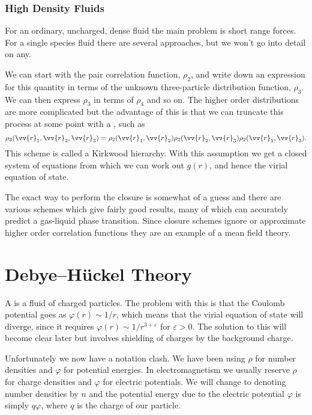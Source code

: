 \documentclass[fleqn]{NotesClass}
\begin{document}
    \subsection{High Density Fluids}
    For an ordinary, uncharged, dense fluid the main problem is short range forces.
    For a single species fluid there are several approaches, but we won't go into detail on any.
    
    We can start with the pair correlation function, \(\rho_2\), and write down an expression for this quantity in terms of the unknown three-particle distribution function, \(\rho_3\).
    We can then express \(\rho_3\) in terms of \(\rho_4\) and so on.
    The higher order distributions are more complicated but the advantage of this is that we can truncate this process at some point with a , such as
    \begin{equation}
        \rho_3(\vv{r}_1, \vv{r}_2, \vv{r}_3) = \rho_2(\vv{r}_1, \vv{r}_2) \rho_2(\vv{r}_2, \vv{r}_3) \rho_2(\vv{r}_1, \vv{r}_3).
    \end{equation}
    This scheme is called a Kirkwood hierarchy.
    With this assumption we get a closed system of equations from which we can work out \(g(r)\), and hence the virial equation of state.
    
    The exact way to perform the closure is somewhat of a guess and there are various schemes which give fairly good results, many of which can accurately predict a gas-liquid phase transition.
    Since closure schemes ignore or approximate higher order correlation functions they are an example of a mean field theory.
    
    \chapter{Debye--H\"uckel Theory}
    A  is a fluid of charged particles.
    The problem with this is that the Coulomb potential goes as \(\varphi(r) \sim 1 / r\), which means that the virial equation of state will diverge, since it requires \(\varphi(r) \sim 1 / r^{3 + \varepsilon}\) for \(\varepsilon > 0\).
    The solution to this will become clear later but involves shielding of charges by the background charge.
    
    \begin{ntn}{}{}
        Unfortunately we now have a notation clash.
        We have been using \(\rho\) for number densities and \(\varphi\) for potential energies.
        In electromagnetism we usually reserve \(\rho\) for charge densities and \(\varphi\) for electric potentials.
        We will change to denoting number densities by \(n\) and the potential energy due to the electric potential \(\varphi\) is simply \(q\varphi\), where \(q\) is the charge of our particle.
    \end{ntn}
    
\end{document}
